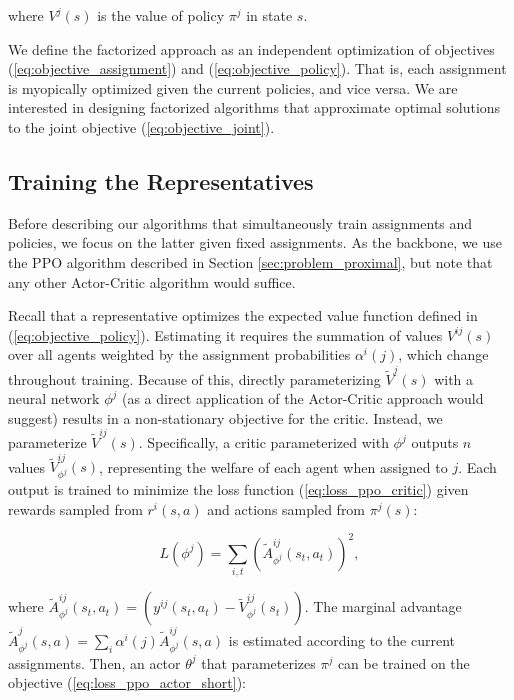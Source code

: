 \documentclass[letterpaper]{article} %
\begin{document}
\noindent where $V^j(s)$ is the value of policy $\pi^j$ in state $s$.


We define the factorized approach as an independent optimization of objectives (\ref{eq:objective_assignment}) and (\ref{eq:objective_policy}). That is, each assignment is myopically optimized given the current policies, and vice versa. We are interested in designing factorized algorithms that approximate optimal solutions to the joint objective (\ref{eq:objective_joint}).


\subsection{Training the Representatives}\label{sec:our_representatives}

Before describing our algorithms that simultaneously train assignments and policies, we focus on the latter given fixed assignments. As the backbone, we use the PPO algorithm described in Section \ref{sec:problem_proximal}, but note that any other Actor-Critic algorithm would suffice.%

Recall that a representative optimizes the expected value function defined in (\ref{eq:objective_policy}). Estimating it requires the summation of values $V^{ij}(s)$ over all agents weighted by the assignment probabilities $\alpha^i(j)$, which change throughout training. Because of this, directly parameterizing $\tilde{V}^j(s)$ with a neural network $\phi^j$ (as a direct application of the Actor-Critic approach would suggest) results in a non-stationary objective for the critic. Instead, we parameterize $\tilde{V}^{ij}(s)$. Specifically, a critic parameterized with $\phi^j$ outputs $n$ values $\tilde{V}_{\phi^j}^{ij}(s)$, representing the welfare of each agent when assigned to $j$. Each output is trained to minimize the loss function (\ref{eq:loss_ppo_critic}) given rewards sampled from $r^i(s, a)$ and actions sampled from $\pi^j(s)$: %



\begin{equation}\label{eq:loss_our_critic}
    L(\phi^j) = \sum_{i, t} \left( \tilde{A}_{\phi^j}^{ij}(s_t, a_t) \right)^2,
\end{equation}

\noindent where $\tilde{A}_{\phi^j}^{ij}(s_t, a_t) = (y^{ij}(s_t, a_t) - \tilde{V}^{ij}_{\phi^j}(s_t))$. The marginal advantage $\tilde{A}_{\phi^j}^j(s, a) = \sum_i \alpha^i(j) \tilde{A}_{\phi^j}^{ij}(s, a)$ is estimated according to the current assignments. Then, an actor $\theta^j$ that parameterizes $\pi^j$ can be trained on the objective (\ref{eq:loss_ppo_actor_short}):
\end{document}
